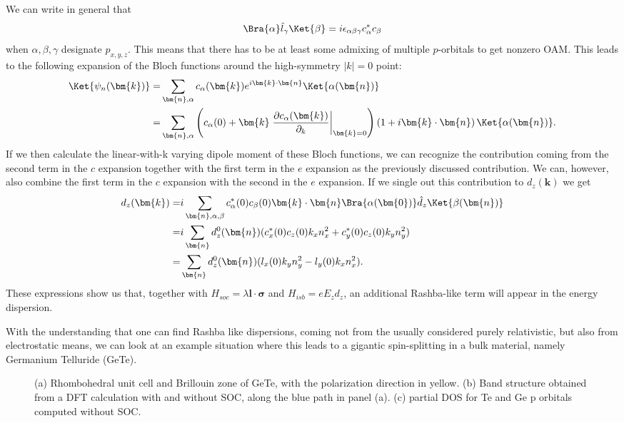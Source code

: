 We can write in general that
\begin{equation}
	\Bra{\alpha} \hat{l}_{\gamma} \Ket{\beta} = i \epsilon_{\alpha \beta \gamma} c^*_\alpha c_\beta
\end{equation}
when $\alpha,\beta,\gamma$ designate $p_{x,y,z}$. This means that there has to be at least some admixing of multiple $p$-orbitals to get nonzero OAM. This leads to the following expansion of the Bloch functions around the high-symmetry $|k|=0$ point:
\begin{align}
	\Ket{\psi_n(\bm{k})} =& \sum_{\bm{n},\alpha} c_\alpha(\bm{k}) e^{i \bm{k}\cdot\bm{n}}\Ket{\alpha(\bm{n})}\\
	=& \sum_{\bm{n},\alpha} \left(c_\alpha(0) + \bm{k}\left.\frac{\partial c_\alpha(\bm{k})}{\partial_k}\right\rvert_{\bm{k}=0} \right)\left(1 + i\bm{k}\cdot\bm{n}\right)\Ket{\alpha(\bm{n})} .
\end{align}
If we then calculate the linear-with-k varying dipole moment of these Bloch functions, we can recognize the contribution coming from the second term in the $c$ expansion together with the first term in the $e$ expansion as the previously discussed contribution. We can, however, also combine the first term in the $c$ expansion with the second in the $e$ expansion. If we single out this contribution to $d_z(\bm{k})$ we get
\begin{align}
	\label{eq:d_z_from_OAM}
	d_z(\bm{k}) =&  i\sum_{\bm{n},\alpha,\beta} c_\alpha^*(0)c_\beta(0)\bm{k}\cdot\bm{n}\Bra{\alpha(\bm{0})} \hat{d}_z \Ket{\beta(\bm{n})}\\
	=&i\sum_{\bm{n}} d^0_z(\bm{n}) (c^*_x(0)c_z(0)k_x n_x^2 + c^*_y(0)c_z(0) k_y n_y^2) \\
	=&\sum_{\bm{n}} d^0_z(\bm{n}) (l_x(0)k_y n_y^2-l_y(0) k_x n_x^2).
\end{align}
These expressions show us that, together with $H_{soc} = \lambda \bm{l}\cdot\bm{\sigma}$ and $H_{isb} = e E_z d_z$, an additional Rashba-like term will appear in the energy dispersion.

With the understanding that one can find Rashba like dispersions, coming not from the usually considered purely relativistic, but also from electrostatic means, we can look at an example situation where this leads to a gigantic spin-splitting in a bulk material, namely Germanium Telluride (GeTe).

\begin{figure}[b]
{}
\caption{\label{fig:eigvalsdos}(a) Rhombohedral unit cell and Brillouin zone of GeTe, with the polarization direction in yellow. (b) Band structure obtained from a DFT calculation with and without SOC, along the blue path in panel (a). (c) partial DOS for Te and Ge p orbitals computed without SOC.}
\end{figure}
